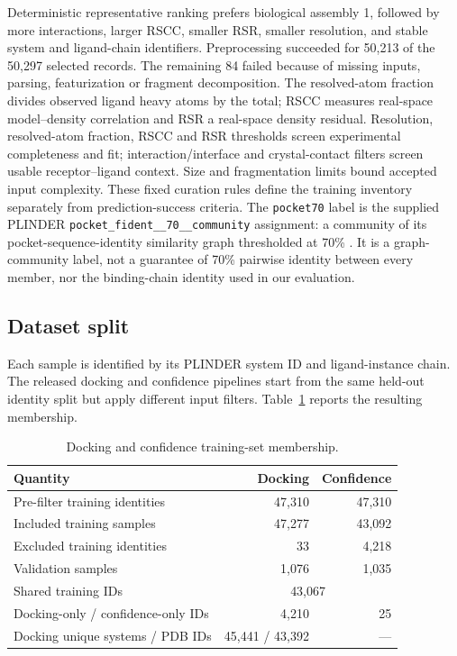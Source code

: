 \documentclass{article}
\newcommand{\citep}[1]{\cite{#1}}
\begin{document}
Deterministic representative ranking prefers biological assembly 1, followed by more interactions, larger RSCC, smaller RSR, smaller resolution, and stable system and ligand-chain identifiers.
Preprocessing succeeded for 50,213 of the 50,297 selected records. The remaining 84 failed because of missing inputs, parsing, featurization or fragment decomposition.
The resolved-atom fraction divides observed ligand heavy atoms by the total; RSCC measures real-space model--density correlation and RSR a real-space density residual. Resolution, resolved-atom fraction, RSCC and RSR thresholds screen experimental completeness and fit; interaction/interface and crystal-contact filters screen usable receptor--ligand context. Size and fragmentation limits bound accepted input complexity. These fixed curation rules define the training inventory separately from prediction-success criteria. The \texttt{pocket70} label is the supplied PLINDER \texttt{pocket\_fident\_\_70\_\_community} assignment: a community of its pocket-sequence-identity similarity graph thresholded at 70\% \citep{durairaj2024plinder}. It is a graph-community label, not a guarantee of 70\% pairwise identity between every member, nor the binding-chain identity used in our evaluation.

\subsection{Dataset split}

Each sample is identified by its PLINDER system ID and ligand-instance chain.
The released docking and confidence pipelines start from the same held-out identity split but apply different input filters.
Table~\ref{tab:si_split} reports the resulting membership.

\begin{table}[htbp]
    \centering
    \caption{Docking and confidence training-set membership.}
    \label{tab:si_split}
    \begin{tabular}{lrr}
        \toprule
        Quantity & Docking & Confidence \\
        \midrule
        Pre-filter training identities & 47,310 & 47,310 \\
        Included training samples & 47,277 & 43,092 \\
        Excluded training identities & 33 & 4,218 \\
        Validation samples & 1,076 & 1,035 \\
        Shared training IDs & \multicolumn{2}{c}{43,067} \\
        Docking-only / confidence-only IDs & 4,210 & 25 \\
        Docking unique systems / PDB IDs & 45,441 / 43,392 & --- \\
        \bottomrule
    \end{tabular}
\end{table}
\end{document}
